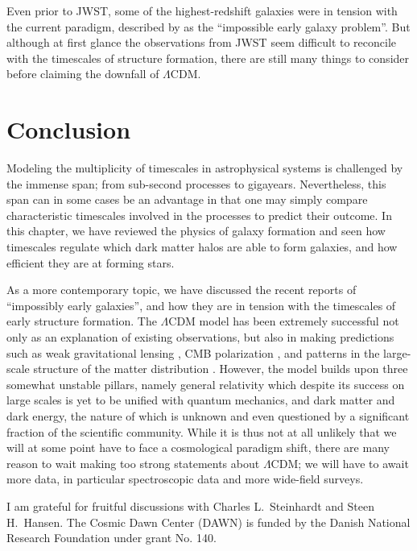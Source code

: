 \documentclass[useAMS,usenatbib,bibyear]{aa}
\begin{document}
Even prior to JWST, some of the highest-redshift galaxies were in tension with the current paradigm, described by \citet{Steinhardt2016} as the ``impossible early galaxy problem''.
But although at first glance the observations from JWST seem difficult to reconcile with the timescales of structure formation, there are still many things to consider before claiming the downfall of $\Lambda$CDM.

\section{Conclusion}
\label{sec:conclusion}

Modeling the multiplicity of timescales in astrophysical systems is challenged by the immense span; from sub-second processes to gigayears.
Nevertheless, this span can in some cases be an advantage in that one may simply compare characteristic timescales involved in the processes to predict their outcome.
In this chapter, we have reviewed the physics of galaxy formation and seen how timescales regulate which dark matter halos are able to form galaxies, and how efficient they are at forming stars.

As a more contemporary topic, we have discussed the recent reports of ``impossibly early galaxies'', and how they are in tension with the timescales of early structure formation.
The $\Lambda$CDM model has been extremely successful not only as an explanation of existing observations, but also in making predictions such as weak gravitational lensing \citep{Fischer2000}, CMB polarization \citep{Kovac2002}, and patterns in the large-scale structure of the matter distribution
\citep{Eisenstein2005}.
However, the model builds upon three somewhat unstable pillars, namely general relativity which despite its success on large scales is yet to be unified with quantum mechanics, and dark matter and dark energy, the nature of which is unknown and even questioned by a significant fraction of the scientific community.
While it is thus not at all unlikely that we will at some point have to face a cosmological paradigm shift, there are many reason to wait making too strong statements about $\Lambda$CDM; we will have to await more data, in particular spectroscopic data and more wide-field surveys.

\begin{center}
\end{center}

\begin{acknowledgements}
    I am grateful for fruitful discussions with Charles L.~Steinhardt and Steen H.~Hansen.
    The Cosmic Dawn Center (DAWN) is funded by the Danish National Research Foundation under grant No. 140.
\end{acknowledgements}



\end{document}
